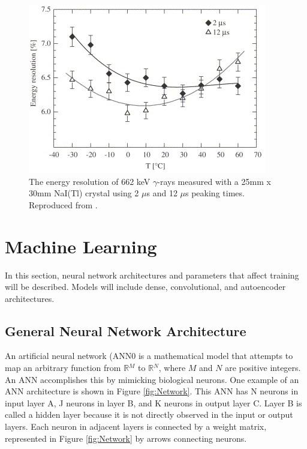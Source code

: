 \begin{figure}[H]
\centering
\includegraphics[width=0.95\linewidth]{images/temp-dependence-resolution-moszynski}
\caption{The energy resolution of 662 keV $\gamma$-rays measured with a 25mm x 30mm NaI(Tl) crystal using 2 $\mu$s and 12 $\mu$s peaking times. Reproduced from \cite{MOSZYNSKI2006739}.}


\label{fig:temp-dependence-resolution-moszynski}
\end{figure}

\section{Machine Learning}

In this section, neural network architectures and parameters that affect training will be described. Models will include dense, convolutional, and autoencoder architectures. 

\subsection{General Neural Network Architecture}

An artificial neural network (ANN0 is a mathematical model that attempts to map an arbitrary function from $\mathbb{R}{^M}$ to $\mathbb{R}{^N}$, where $M$ and $N$ are positive integers. An ANN accomplishes this by mimicking biological neurons. One example of an ANN architecture is shown in Figure \ref{fig:Network}. This ANN has N neurons in input layer A, J neurons in layer B, and K neurons in output layer C. Layer B is called a hidden layer because it is not directly observed in the input or output layers. Each neuron in adjacent layers is connected by a weight matrix, represented in Figure \ref{fig:Network} by arrows connecting neurons. 


